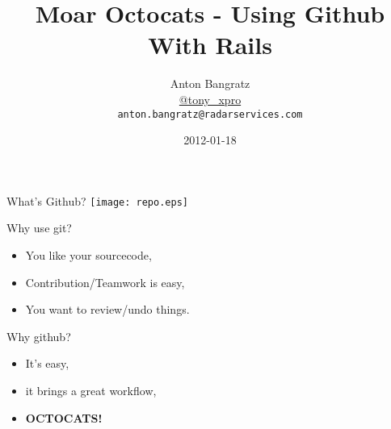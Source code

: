 \documentclass[style=husky]{powerdot}
\title{Moar Octocats - Using Github With Rails}
\author{Anton Bangratz\\
	\url{@tony_xpro}\\
	\texttt{anton.bangratz@radarservices.com}}
\date{2012-01-18}
\begin{document}
\maketitle
\begin{slide}{What's Github?}
\texttt{[image: repo.eps]}
\end{slide}
\begin{slide}{Why use git?}
\pause
	\begin{itemize}
		\item You like your sourcecode,\pause
		\item Contribution/Teamwork is easy\pause,
		\item You want to review/undo things.\pause
	\end{itemize}
\end{slide}
\begin{slide}{Why github?}
\pause
	\begin{itemize}
		\item It's easy,\pause
		\item it brings a great workflow,\pause
		\item \textbf{OCTOCATS!}
	\end{itemize}
\end{slide}
\end{document}
